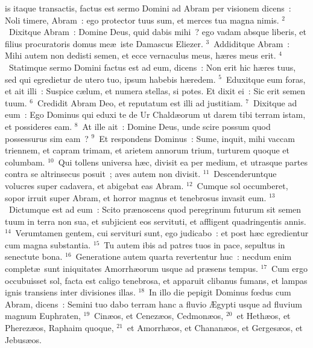 \bchapter
{}is itaque transactis, factus est sermo Domini ad Abram per visionem dicens~: Noli timere, Abram~: ego protector tuus sum, et merces tua magna nimis.
${}^{2}$~Dixitque Abram~: Domine Deus, quid dabis mihi~? ego vadam absque liberis, et filius procuratoris domus me\ae\ iste Damascus Eliezer.
${}^{3}$~Addiditque Abram~: Mihi autem non dedisti semen, et ecce vernaculus meus, h\ae res meus erit.
${}^{4}$~Statimque sermo Domini factus est ad eum, dicens~: Non erit hic h\ae res tuus, sed qui egredietur de utero tuo, ipsum habebis h\ae redem.
${}^{5}$~Eduxitque eum foras, et ait illi~: Suspice c\ae lum, et numera stellas, si potes. Et dixit ei~: Sic erit semen tuum.
${}^{6}$~Credidit Abram Deo, et reputatum est illi ad justitiam.
${}^{7}$~Dixitque ad eum~: Ego Dominus qui eduxi te de Ur Chald\ae orum ut darem tibi terram istam, et possideres eam.
${}^{8}$~At ille ait~: Domine Deus, unde scire possum quod possessurus sim eam~?
${}^{9}$~Et respondens Dominus~: Sume, inquit, mihi vaccam triennem, et capram trimam, et arietem annorum trium, turturem quoque et columbam.
${}^{10}$~Qui tollens universa h\ae c, divisit ea per medium, et utrasque partes contra se altrinsecus posuit~; aves autem non divisit.
${}^{11}$~Descenderuntque volucres super cadavera, et abigebat eas Abram.
${}^{12}$~Cumque sol occumberet, sopor irruit super Abram, et horror magnus et tenebrosus invasit eum.
${}^{13}$~Dictumque est ad eum~: Scito pr\ae noscens quod peregrinum futurum sit semen tuum in terra non sua, et subjicient eos servituti, et affligent quadringentis annis.
${}^{14}$~Verumtamen gentem, cui servituri sunt, ego judicabo~: et post h\ae c egredientur cum magna substantia.
${}^{15}$~Tu autem ibis ad patres tuos in pace, sepultus in senectute bona.
${}^{16}$~Generatione autem quarta revertentur huc~: necdum enim complet\ae\ sunt iniquitates Amorrh\ae orum usque ad pr\ae sens tempus.
${}^{17}$~Cum ergo occubuisset sol, facta est caligo tenebrosa, et apparuit clibanus fumans, et lampas ignis transiens inter divisiones illas.
${}^{18}$~In illo die pepigit Dominus fœdus cum Abram, dicens~: Semini tuo dabo terram hanc a fluvio \AE gypti usque ad fluvium magnum Euphraten,
${}^{19}$~Cin\ae os, et Cenez\ae os, Cedmon\ae os,
${}^{20}$~et Heth\ae os, et Pherez\ae os, Raphaim quoque,
${}^{21}$~et Amorrh\ae os, et Chanan\ae os, et Gerges\ae os, et Jebus\ae os.

